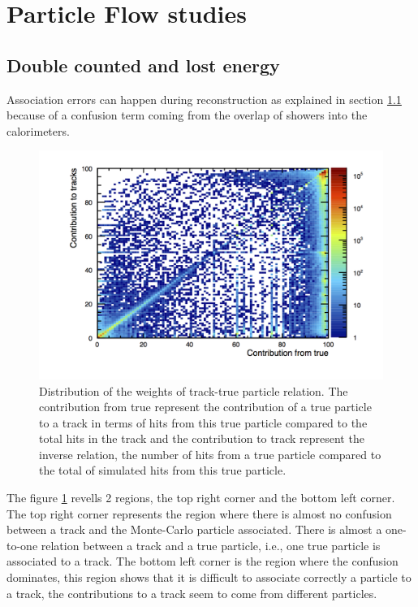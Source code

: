 \section{Particle Flow studies}

\subsection{Double counted and lost energy}

Association errors can happen during reconstruction as explained in section \ref{} because of a confusion term coming from the overlap of showers into the calorimeters.

\begin{figure}[t]
  \centering
  \includegraphics[width=1\linewidth]{chap6/fig_SGV/weight_corr.png}
  \caption{Distribution of the weights of track-true particle relation. The contribution from true represent the contribution of a true particle to a track in terms of hits from this true particle compared to the total hits in the track and the contribution to track represent the inverse relation, the number of hits from a true particle compared to the total of simulated hits from this true particle.}
  \label{fig:weight_tracks}
\end{figure}

The figure \ref{fig:weight_tracks} revells 2 regions, the top right corner and the bottom left corner. The top right corner represents the region where there is almost no confusion between a track and the Monte-Carlo particle associated. There is almost a one-to-one relation between a track and a true particle, i.e., one true particle is associated to a track. The bottom left corner is the region where the confusion dominates, this region shows that it is difficult to associate correctly a particle to a track, the contributions to a track seem to come from different particles.

